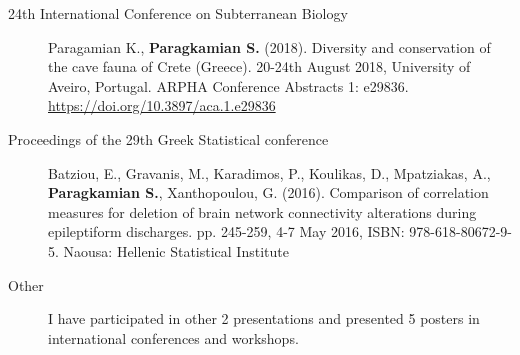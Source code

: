 \begin{description}
\item[24th International Conference on Subterranean Biology] Paragamian K., \textbf{Paragkamian S.} (2018). Diversity and conservation of the cave fauna of Crete (Greece). 20-24th August 2018, University of Aveiro, Portugal. ARPHA Conference Abstracts 1: e29836. \url{https://doi.org/10.3897/aca.1.e29836}
  
  
  
    \item[Proceedings of the 29th Greek Statistical conference] Batziou, E., Gravanis, M., Karadimos, P., Koulikas, D., Mpatziakas, A., \textbf{Paragkamian S.}, Xanthopoulou, G. (2016). Comparison of correlation measures for deletion of brain network connectivity alterations during epileptiform discharges. pp. 245-259, 4-7 May 2016, ISBN: 978-618-80672-9-5. Naousa: Hellenic Statistical Institute

\item[Other] I have participated in other 2 presentations and presented 5 posters in international conferences and workshops.

\end{description}

\begin{refsection}
\nocite{*}
\printbibliography[keyword=own,title={My published works}]
\label{cv:my_refs}
\end{refsection}
